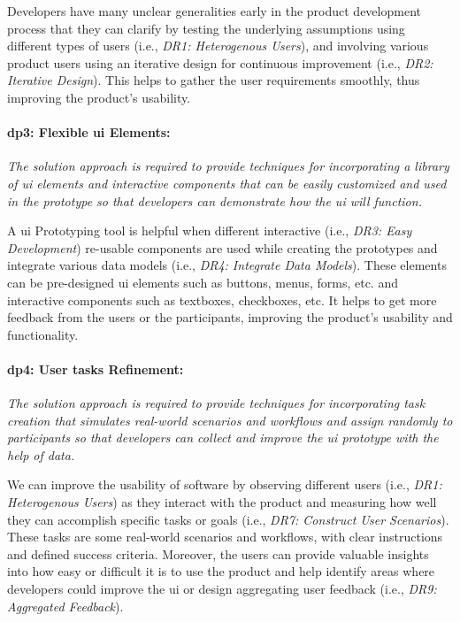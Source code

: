 Developers have many unclear generalities early in the product development process \cite{misc:lean:steve} that they can clarify by testing the underlying assumptions using different types of users (i.e., \textit{DR1: Heterogenous Users}), and involving various product users using an iterative design for continuous improvement (i.e., \textit{DR2: Iterative Design}).
This helps to gather the user requirements smoothly, thus improving the product's usability.

\paragraph{\ac{dp}3: Flexible \ac{ui} Elements:} \textit{The solution approach is required to provide techniques for incorporating a library of \ac{ui} elements and interactive components that can be easily customized and used in the prototype so that developers can demonstrate how the \ac{ui} will function.}

A \ac{ui} Prototyping tool is helpful when different interactive (i.e., \textit{DR3: Easy Development}) re-usable components are used while creating the prototypes and integrate various data models (i.e., \textit{DR4: Integrate Data Models}).
These elements can be pre-designed \ac{ui} elements such as buttons, menus, forms, etc. and interactive components such as textboxes, checkboxes, etc.
It helps to get more feedback from the users or the participants, improving the product's usability and functionality.

\paragraph{\ac{dp}4: User tasks Refinement:} \textit{The solution approach is required to provide techniques for incorporating task creation that simulates real-world scenarios and workflows and assign randomly to participants so that developers can collect and improve the \ac{ui} prototype with the help of data.}

We can improve the usability of software by observing different users (i.e., \textit{DR1: Heterogenous Users}) as they interact with the product and measuring how well they can accomplish specific tasks or goals (i.e., \textit{DR7: Construct User Scenarios}).
These tasks are some real-world scenarios and workflows, with clear instructions and defined success criteria.
Moreover, the users can provide valuable insights into how easy or difficult it is to use the product and help identify areas where developers could improve the \ac{ui} or design aggregating user feedback (i.e., \textit{DR9: Aggregated Feedback}).

